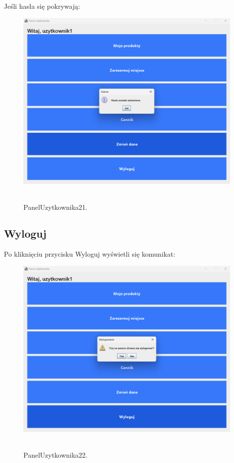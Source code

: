 Jeśli hasła się pokrywają:

\begin{figure}[H]
    \centering
    \includegraphics[width=.9\linewidth]{figures/PanelUzytkownika21.png}\
    \caption{PanelUzytkownika21.\label{PanelUzytkownika21}}
\end{figure}

\subsection{Wyloguj}
\label{subsec:Wyloguj}

Po kliknięciu przycisku Wyloguj wyświetli się komunikat:

\begin{figure}[H]
    \centering
    \includegraphics[width=.9\linewidth]{figures/PanelUzytkownika22.png}\
    \caption{PanelUzytkownika22.\label{PanelUzytkownika22}}
\end{figure}

